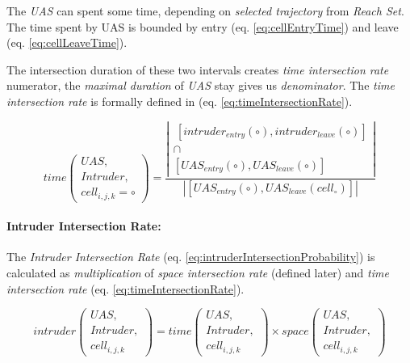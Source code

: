 The \emph{UAS} can spent some time, depending on \emph{selected trajectory} from \emph{Reach Set}. The time spent by UAS is bounded by entry (eq. \ref{eq:cellEntryTime}) and leave (eq. \ref{eq:cellLeaveTime}). 

The intersection duration of these two intervals creates \emph{time intersection rate} numerator, the \emph{maximal duration} of \emph{UAS} stay gives us \emph{denominator}. The \emph{time intersection rate} is formally defined in (eq. \ref{eq:timeIntersectionRate}). 

\begin{equation}\label{eq:timeIntersectionRate}
    time\left(\begin{gathered}UAS,\\Intruder,\\cell_{i,j,k}=\circ\end{gathered}\right)=  
    \frac{
        \left|
        \begin{gathered}
            \ [intruder_{entry}(\circ),intruder_{leave}(\circ)] \\
            \cap\\
            [UAS_{entry}(\circ),UAS_{leave}(\circ)]
        \end{gathered}\right|
        }
        {
        \left|\left[UAS_{entry}(\circ),UAS_{leave}(cell_{\circ})\right]\right|
        }
\end{equation}


\paragraph{Intruder Intersection Rate:} The \emph{Intruder Intersection Rate} (eq. \ref{eq:intruderIntersectionProbability}) is calculated as \emph{multiplication} of \emph{space intersection rate} (defined later) and \emph{time intersection rate} (eq. \ref{eq:timeIntersectionRate}).

\begin{equation}\label{eq:intruderIntersectionProbability}
    intruder\left(\begin{gathered}UAS,\\Intruder,\\cell_{i,j,k}\end{gathered}\right) = time \left(\begin{gathered}UAS,\\Intruder,\\cell_{i,j,k}\end{gathered}\right) \times space\left(\begin{gathered}UAS,\\Intruder,\\cell_{i,j,k}\end{gathered}\right)
\end{equation}

